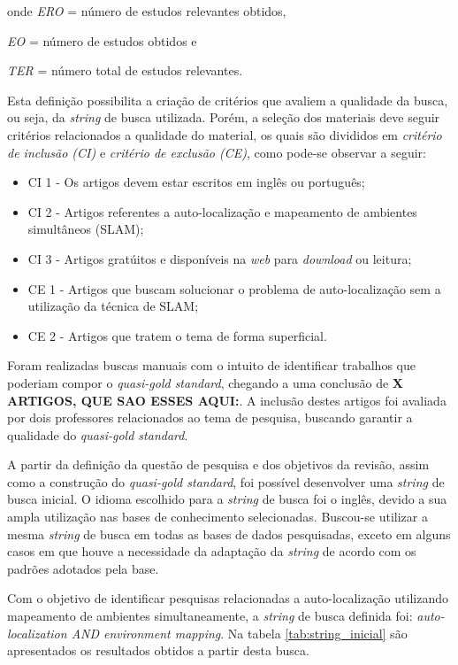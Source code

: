 		onde \textit{ERO} = número de estudos relevantes obtidos,
		
		\textit{EO} = número de estudos obtidos e

		\textit{TER} = número total de estudos relevantes.

		Esta definição possibilita a criação de critérios que avaliem a qualidade da busca, ou seja, da \textit{string} de busca utilizada. Porém, a seleção dos materiais deve seguir critérios relacionados a qualidade do material, os quais são divididos em \textit{critério de inclusão (CI)} e \textit{critério de exclusão (CE)}, como pode-se observar a seguir:

		\begin{itemize}
			\item CI 1 - Os artigos devem estar escritos em inglês ou português;
			\item CI 2 - Artigos referentes a auto-localização e mapeamento de ambientes simultâneos (SLAM);
			\item CI 3 - Artigos gratúitos e disponíveis na \textit{web} para \textit{download} ou leitura;
			\item CE 1 - Artigos que buscam solucionar o problema de auto-localização sem a utilização da técnica de SLAM;
			\item CE 2 - Artigos que tratem o tema de forma superficial. 
		\end{itemize}

		Foram realizadas buscas manuais com o intuito de identificar trabalhos que poderiam compor o \textit{quasi-gold standard}, chegando a uma conclusão de \textbf{X ARTIGOS, QUE SAO ESSES AQUI:}. A inclusão destes artigos foi avaliada por dois professores relacionados ao tema de pesquisa, buscando garantir a qualidade do \textit{quasi-gold standard}.

		A partir da definição da questão de pesquisa e dos objetivos da revisão, assim como a construção do \textit{quasi-gold standard}, foi possível desenvolver uma \textit{string} de busca inicial. O idioma escolhido para a \textit{string} de busca foi o inglês, devido a sua ampla utilização nas bases de conhecimento selecionadas. Buscou-se utilizar a mesma \textit{string} de busca em todas as bases de dados pesquisadas, exceto em alguns casos em que houve a necessidade da adaptação da \textit{string} de acordo com os padrões adotados pela base.


			Com o objetivo de identificar pesquisas relacionadas a auto-localização utilizando mapeamento de ambientes simultaneamente, a \textit{string} de busca definida foi: \textit{auto-localization AND environment mapping}. Na tabela \ref{tab:string_inicial} são apresentados os resultados obtidos a partir desta busca.

